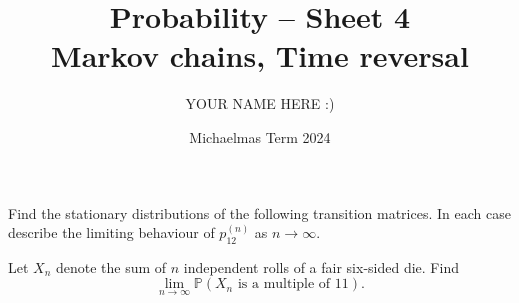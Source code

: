 \documentclass[answers]{exam}
\title{Probability -- Sheet 4\\Markov chains, Time reversal}
\author{YOUR NAME HERE :)}
\date{Michaelmas Term 2024}
\begin{document}
\maketitle

\begin{questions}

\question%
Find the stationary distributions of the following transition matrices. In each case describe the limiting behaviour of $p_{12}^{(n)}$ as $n \to \infty$.



\question%
Let $X_{n}$ denote the sum of $n$ independent rolls of a fair six-sided die. Find \[
	\lim _{n \to \infty} \mathbb{P}(X_{n} \text { is a multiple of } 11).
\]




\end{questions}
\end{document}
